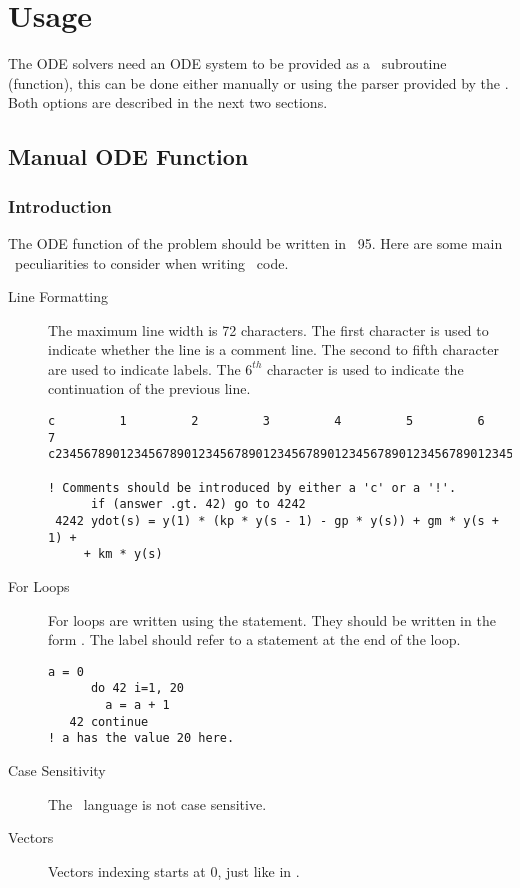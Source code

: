 \chapter{Usage} \label{ch:Usage}
The ODE solvers need an ODE system to be provided as a \Fortran~subroutine (function), this can be done either manually or using the parser provided by the \PPODESUITE. Both options are described in the next two sections.
\section{Manual ODE Function}
\subsection{Introduction}
The ODE function of the problem should be written in \Fortran~95. Here are some main \Fortran~peculiarities to consider when writing \Fortran~code.
\begin{description}
 \item[Line Formatting] The maximum line width is 72 characters. The first character is used to indicate whether the line is a comment line. The second to fifth character are used to indicate labels. The $6^{th}$ character is used to indicate the continuation of the previous line.
 \begin{lstlisting}[style=fortrancode,caption=Syntax Example]
c         1         2         3         4         5         6         7
c23456789012345678901234567890123456789012345678901234567890123456789012

! Comments should be introduced by either a 'c' or a '!'.
      if (answer .gt. 42) go to 4242
 4242 ydot(s) = y(1) * (kp * y(s - 1) - gp * y(s)) + gm * y(s + 1) +
     + km * y(s)
 \end{lstlisting}
 \item[For Loops] For loops are written using the  statement. They should be written in the form . The label should refer to a  statement at the end of the loop.
  \begin{lstlisting}[style=fortrancode,caption=Do-Loop]
      a = 0
      do 42 i=1, 20
        a = a + 1
   42 continue
! a has the value 20 here.
 \end{lstlisting}
 \item[Case Sensitivity] The \Fortran~language is not case sensitive.
 \item[Vectors] Vectors indexing starts at 0, just like in \MATLAB.
\end{description}


